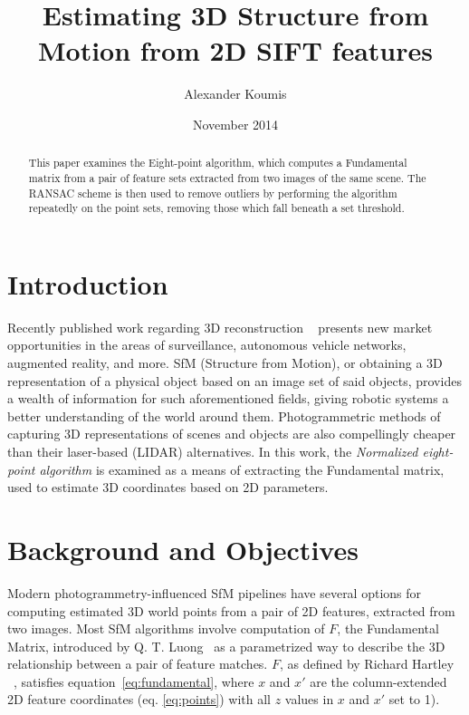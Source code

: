 \documentclass[Conference]{IEEEtran}
\title{Estimating 3D Structure from Motion from 2D SIFT features}
\author{Alexander Koumis}
\date{November 2014}
\begin{document}
\author{
}

\maketitle

\begin{abstract}
This paper examines the Eight-point algorithm, which computes a Fundamental matrix from a pair of feature sets extracted from two images of the same scene. The RANSAC scheme is then used to remove outliers by performing the algorithm repeatedly on the point sets, removing those which fall beneath a set threshold.
\end{abstract}

\section{Introduction}
Recently published work regarding 3D reconstruction ~\cite{Hartley2004} presents new market opportunities in the areas of surveillance, autonomous vehicle networks, augmented reality, and more. SfM (Structure from Motion), or obtaining a 3D representation of a physical object based on an image set of said objects, provides a wealth of information for such aforementioned fields, giving robotic systems a better understanding of the world around them. Photogrammetric methods of capturing 3D representations of scenes and objects are also compellingly cheaper than their laser-based (LIDAR) alternatives.
In this work, the \textit{Normalized eight-point algorithm} is examined as a means of extracting the Fundamental matrix, used to estimate 3D coordinates based on 2D parameters.

\section{Background and Objectives}
Modern photogrammetry-influenced SfM pipelines have several options for computing estimated 3D world points from a pair of 2D features, extracted from two images. Most SfM algorithms involve computation of \(F\), the Fundamental Matrix, introduced by Q. T. Luong~\cite{AICPub329:1992} as a parametrized way to describe the 3D relationship between a pair of feature matches. \(F\), as defined by Richard Hartley ~\cite{Hartley2004}, satisfies equation~\ref{eq:fundamental}, where \(x\) and \(x'\) are the column-extended 2D feature coordinates (eq. \ref{eq:points}) with all \(z\) values in \(x\) and \(x'\) set to 1).
\end{document}
